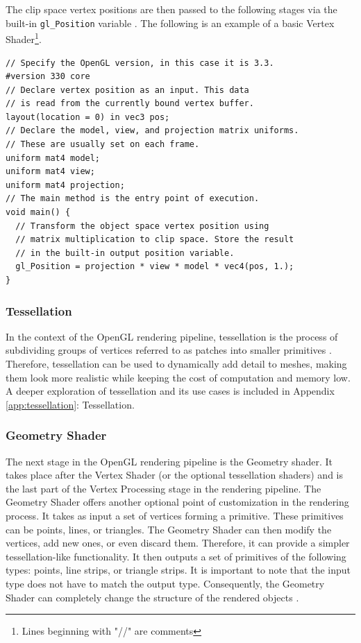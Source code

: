 \documentclass[
  digital,     %
  oneside,     %
  nosansbold,  %
  nocolorbold, %
  lof,         %
  lot,         %
]{fithesis4}
\begin{document}
The clip space vertex positions are then passed to the following stages via the
built-in \verb|gl_Position| variable \cite{openglwiki-vertex-shader}. The following is an example
of a basic Vertex Shader\footnote{Lines beginning with "//" are comments}.
\pagebreak
\begin{verbatim}
// Specify the OpenGL version, in this case it is 3.3.
#version 330 core
// Declare vertex position as an input. This data
// is read from the currently bound vertex buffer.
layout(location = 0) in vec3 pos;
// Declare the model, view, and projection matrix uniforms.
// These are usually set on each frame.
uniform mat4 model;
uniform mat4 view;
uniform mat4 projection;
// The main method is the entry point of execution.
void main() {
  // Transform the object space vertex position using
  // matrix multiplication to clip space. Store the result
  // in the built-in output position variable.
  gl_Position = projection * view * model * vec4(pos, 1.);
}
\end{verbatim}

\subsubsection{Tessellation}
In the context of the OpenGL rendering pipeline, tessellation is the process of subdividing groups of
vertices referred to as patches into smaller primitives \cite{openglwiki-tessellation}. Therefore, tessellation
can be used to dynamically add detail to meshes, making them look more realistic while keeping
the cost of computation and memory low. A deeper exploration of tessellation and
its use cases is included in Appendix \ref{app:tessellation}: Tessellation.

\subsubsection{Geometry Shader}
The next stage in the OpenGL rendering pipeline is the Geometry shader. It takes place after the
Vertex Shader (or the optional tessellation shaders) and is the last part of the Vertex Processing
stage in the rendering pipeline. The Geometry Shader offers another optional point of customization
in the rendering process. It takes as input a set of vertices forming a primitive. These primitives can
be points, lines, or triangles. The Geometry Shader can then modify the vertices, add new ones, or
even discard them. Therefore, it can provide a simpler tessellation-like functionality. It then outputs
a set of primitives of the following types: points, line strips, or triangle strips. It is important to note
that the input type does not have to match the output type. Consequently, the Geometry Shader can
completely change the structure of the rendered objects \cite{learnopengl-geometry}\cite{openglwiki-geometry}.
\end{document}
